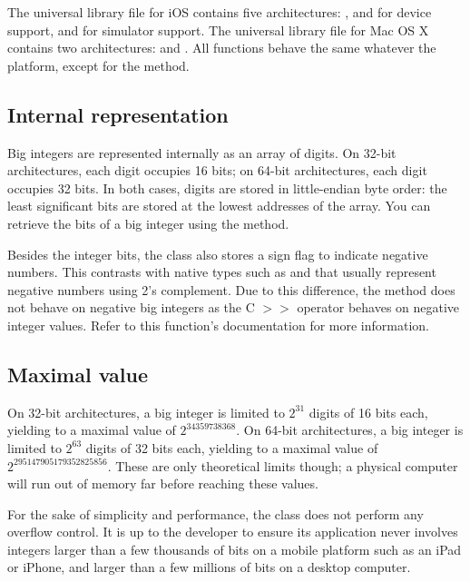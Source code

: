The universal library file for iOS contains five architectures: ,  and  for device support,  and  for simulator support. The universal library file for Mac OS X contains two architectures:  and . All functions behave the same whatever the platform, except for the  method.

\subsection{Internal representation}

Big integers are represented internally as an array of digits. On 32-bit architectures, each digit occupies 16 bits; on 64-bit architectures, each digit occupies 32 bits. In both cases, digits are stored in little-endian byte order: the least significant bits are stored at the lowest addresses of the array. You can retrieve the bits of a big integer using the  method.

Besides the integer bits, the  class also stores a sign flag to indicate negative numbers. This contrasts with native types such as  and  that usually represent negative numbers using 2's complement. Due to this difference, the  method does not behave on negative big integers as the C $>>$ operator behaves on negative integer values. Refer to this function's documentation for more information.

\subsection{Maximal value}

On 32-bit architectures, a big integer is limited to $2^{31}$ digits of 16 bits each, yielding to a maximal value of $2^{34359738368}$. On 64-bit architectures, a big integer is limited to $2^{63}$ digits of 32 bits each, yielding to a maximal value of $2^{295147905179352825856}$. These are only theoretical limits though; a physical computer will run out of memory far before reaching these values.

For the sake of simplicity and performance, the  class does not perform any overflow control. It is up to the developer to ensure its application never involves integers larger than a few thousands of bits on a mobile platform such as an iPad or iPhone, and larger than a few millions of bits on a desktop computer.

